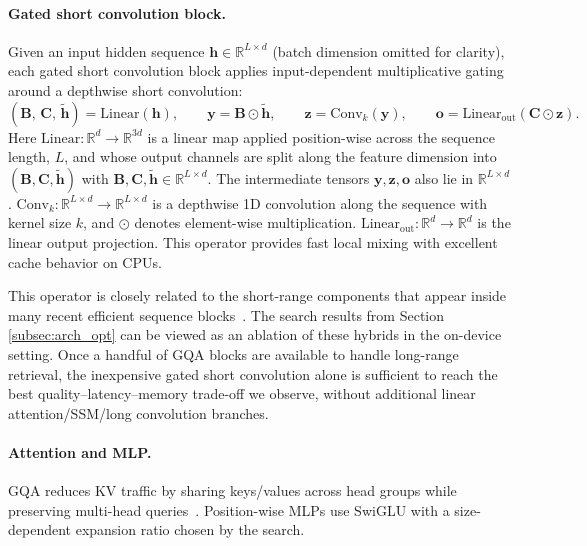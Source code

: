 \documentclass{article}
\begin{document}
\paragraph{Gated short convolution block.}
Given an input hidden sequence $\mathbf{h} \in \mathbb{R}^{L \times d}$ (batch dimension omitted for clarity), each gated short convolution block applies input-dependent multiplicative gating around a depthwise short convolution:
\[
(\mathbf{B},\,\mathbf{C},\,\tilde{\mathbf{h}})=\mathrm{Linear}(\mathbf{h}),\qquad
\mathbf{y}=\mathbf{B}\odot\tilde{\mathbf{h}},\qquad
\mathbf{z}=\mathrm{Conv}_k(\mathbf{y}),\qquad
\mathbf{o}=\mathrm{Linear}_{\text{out}}(\mathbf{C}\odot \mathbf{z}).
\]
Here $\mathrm{Linear}: \mathbb{R}^{d} \to \mathbb{R}^{3d}$ is a linear map applied position-wise across the sequence length, $L$, and whose output channels are split along the feature dimension into $(\mathbf{B},\mathbf{C},\tilde{\mathbf{h}})$ with $\mathbf{B},\mathbf{C},\tilde{\mathbf{h}} \in \mathbb{R}^{L \times d}$. The intermediate tensors $\mathbf{y},\mathbf{z},\mathbf{o}$ also lie in $\mathbb{R}^{L \times d}$. $\mathrm{Conv}_k: \mathbb{R}^{L \times d} \to \mathbb{R}^{L \times d}$ is a depthwise 1D convolution along the sequence with kernel size $k$, and $\odot$ denotes element-wise multiplication. $\mathrm{Linear}_{\text{out}}: \mathbb{R}^{d} \to \mathbb{R}^{d}$ is the linear output projection. This operator provides fast local mixing with excellent cache behavior on CPUs.


This operator is closely related to the short-range components that appear inside many recent efficient sequence blocks~\citep{fu2023hungry, poli2023hyena, gu2024mamba, dao2024transformers, yang2025gated}. The search results from Section \ref{subsec:arch_opt} can be viewed as an ablation of these hybrids in the on-device setting. Once a handful of GQA blocks are available to handle long-range retrieval, the inexpensive gated short convolution alone is sufficient to reach the best quality–latency–memory trade-off we observe, without additional linear attention/SSM/long convolution branches.



\paragraph{Attention and MLP.}
GQA reduces KV traffic by sharing keys/values across head groups while preserving multi-head queries~\citep{ainslie2023gqa}. Position-wise MLPs use SwiGLU with a size-dependent expansion ratio chosen by the search.
\end{document}
